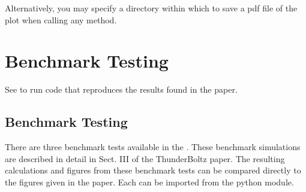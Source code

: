 \documentclass[letterpaper,10pt,english,openany,oneside]{sphinxmanual}
\begin{document}
\begin{sphinxVerbatim}[commandchars=\\\{\}]
 

   

   


\end{sphinxVerbatim}

\sphinxAtStartPar
Alternatively, you may specify a directory within which to
save a pdf file of the plot when calling any  method.

\begin{sphinxVerbatim}[commandchars=\\\{\}]
\end{sphinxVerbatim}


\chapter{Benchmark Testing}
\label{\detokenize{index:benchmark-testing}}
\sphinxAtStartPar
See {\hyperref[\detokenize{bm::doc}]{}} to run code that reproduces
the results found in the paper.

\sphinxstepscope


\section{Benchmark Testing}
\label{\detokenize{bm:benchmark-testing}}\label{\detokenize{bm::doc}}
\sphinxAtStartPar
There are three benchmark tests available in the
.
These benchmark simulations are described in detail in Sect. III of the ThunderBoltz paper.
The resulting calculations and figures from these benchmark tests can be compared directly
to the figures given in the paper. Each can be imported from the  python module.
\end{document}
